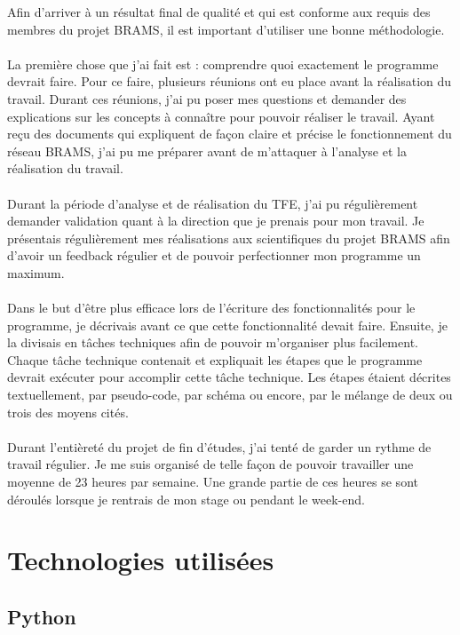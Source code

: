 \documentclass[11pt]{article}
\begin{document}
Afin d'arriver à un résultat final de qualité et qui est conforme aux requis des membres du projet BRAMS, il est important d'utiliser une bonne méthodologie.\\
\\
La première chose que j'ai fait est : comprendre quoi exactement le programme devrait faire.
Pour ce faire, plusieurs réunions ont eu place avant la réalisation du travail.
Durant ces réunions, j'ai pu poser mes questions et demander des explications sur les concepts à connaître pour pouvoir réaliser le travail.
Ayant reçu des documents qui expliquent de façon claire et précise le fonctionnement du réseau BRAMS, j'ai pu me préparer avant de m'attaquer à l'analyse et la réalisation du travail.\\
\\
Durant la période d'analyse et de réalisation du TFE, j'ai pu régulièrement demander validation quant à la direction que je prenais pour mon travail.
Je présentais régulièrement mes réalisations aux scientifiques du projet BRAMS afin d'avoir un feedback régulier et de pouvoir perfectionner mon programme un maximum.\\
\\
Dans le but d'être plus efficace lors de l'écriture des fonctionnalités pour le programme, je décrivais avant ce que cette fonctionnalité devait faire.
Ensuite, je la divisais en tâches techniques afin de pouvoir m'organiser plus facilement.
Chaque tâche technique contenait et expliquait les étapes que le programme devrait exécuter pour accomplir cette tâche technique.
Les étapes étaient décrites textuellement, par pseudo-code, par schéma ou encore, par le mélange de deux ou trois des moyens cités.\\
\\
Durant l'entièreté du projet de fin d'études, j'ai tenté de garder un rythme de travail régulier.
Je me suis organisé de telle façon de pouvoir travailler une moyenne de 23 heures par semaine.
Une grande partie de ces heures se sont déroulés lorsque je rentrais de mon stage ou pendant le week-end.\\

\newpage

\section{Technologies utilisées}

\subsection{Python}
\end{document}
